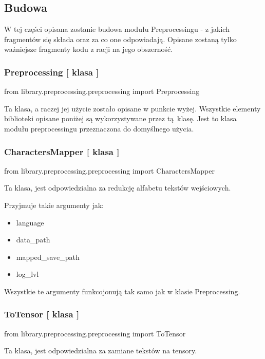 \newpage
\subsection{Budowa}
W tej części opisana zostanie budowa modułu Preprocessingu - z jakich fragmentów się składa
oraz za co one odpowiadają. Opisane zostaną tylko ważniejsze fragmenty kodu z racji na jego 
obszerność.

\subsubsection{Preprocessing [ klasa ] }
\begin{import}
from library.preprocessing.preprocessing import Preprocessing
\end{import}

Ta klasa, a raczej jej użycie zostało opisane w punkcie wyżej. Wszystkie elementy biblioteki opisane
poniżej są wykorzystywane przez tą klasę. Jest to klasa modułu preprocessingu przeznaczona
do domyślnego użycia.

\subsubsection{CharactersMapper [ klasa ] }
\begin{import}
from library.preprocessing.preprocessing import CharactersMapper
\end{import}
Ta klasa, jest odpowiedzialna za redukcję alfabetu tekstów wejściowych. 

Przyjmuje takie argumenty jak: 

\begin{itemize}
	\item language
	\item data\_path
	\item mapped\_save\_path
	\item log\_lvl
\end{itemize}

Wszystkie te argumenty funkcojonują tak samo jak w klasie Preprocessing.


\subsubsection{ToTensor [ klasa ] }
\begin{import}
from library.preprocessing.preprocessing import ToTensor
\end{import}
Ta klasa, jest odpowiedzialna za zamiane tekstów na tensory.

